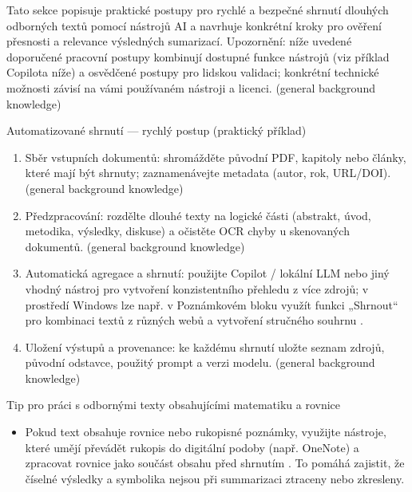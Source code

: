 \documentclass{report}%
\begin{document}
%
Tato sekce popisuje praktické postupy pro rychlé a bezpečné shrnutí dlouhých odborných textů pomocí nástrojů AI a navrhuje konkrétní kroky pro ověření přesnosti a relevance výsledných sumarizací. Upozornění: níže uvedené doporučené pracovní postupy kombinují dostupné funkce nástrojů (viz příklad Copilota níže) a osvědčené postupy pro lidskou validaci; konkrétní technické možnosti závisí na vámi používaném nástroji a licenci. (general background knowledge)

Automatizované shrnutí — rychlý postup (praktický příklad)
\begin{enumerate}
  \item Sběr vstupních dokumentů: shromážděte původní PDF, kapitoly nebo články, které mají být shrnuty; zaznamenávejte metadata (autor, rok, URL/DOI). (general background knowledge)
  \item Předzpracování: rozdělte dlouhé texty na logické části (abstrakt, úvod, metodika, výsledky, diskuse) a očistěte OCR chyby u skenovaných dokumentů. (general background knowledge)
  \item Automatická agregace a shrnutí: použijte Copilot / lokální LLM nebo jiný vhodný nástroj pro vytvoření konzistentního přehledu z více zdrojů; v prostředí Windows lze např. v Poznámkovém bloku využít funkci „Shrnout“ pro kombinaci textů z různých webů a vytvoření stručného souhrnu \cite{kb_ai_101_tipu_pdf_04e4a115_page_14_1}.
  \item Uložení výstupů a provenance: ke každému shrnutí uložte seznam zdrojů, původní odstavce, použitý prompt a verzi modelu. (general background knowledge)
\end{enumerate}

Tip pro práci s odbornými texty obsahujícími matematiku a rovnice
\begin{itemize}
  \item Pokud text obsahuje rovnice nebo rukopisné poznámky, využijte nástroje, které umějí převádět rukopis do digitální podoby (např. OneNote) a zpracovat rovnice jako součást obsahu před shrnutím \cite{kb_ai_101_tipu_pdf_04e4a115_page_8_1}. To pomáhá zajistit, že číselné výsledky a symbolika nejsou při summarizaci ztraceny nebo zkresleny.
\end{itemize}
\end{document}
